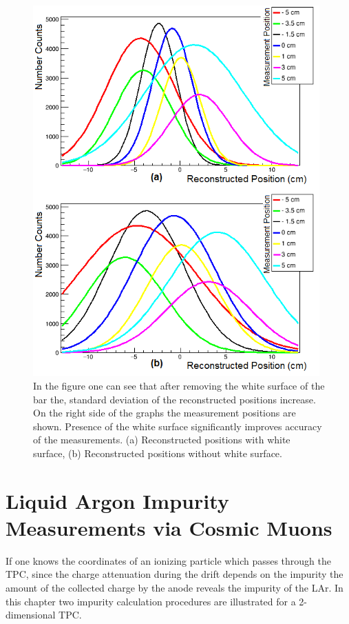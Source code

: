 \documentclass[a4paper]{article}\linespread{1.4}
\begin{document}
\begin{figure}[] \centering \includegraphics[width=110mm,scale=1.0]{figures/rwcc.png} \caption{In the figure one can see that after removing the white surface of the bar the, standard deviation of the reconstructed positions increase. On the right side of the graphs the measurement positions are shown. Presence of the white surface significantly improves accuracy of the measurements. (a) Reconstructed positions with white surface, (b) Reconstructed positions without white surface. } \label{fig:rwcc} \end{figure}   

\clearpage
\newpage\null\thispagestyle{empty}
\section{Liquid Argon Impurity Measurements via Cosmic Muons}
\label{chap:pur}
If one knows the coordinates of an ionizing particle which passes through the TPC, since the charge attenuation during the drift depends on the impurity the amount of the collected charge by the anode reveals the impurity of the LAr. In this chapter two impurity calculation procedures are illustrated for a 2-dimensional TPC.
\end{document}
